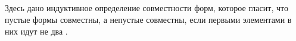 \begin{code}%
\>[0]\<[2]%
\>[2]  \AgdaSymbol{:}  \AgdaSymbol{\{}\AgdaSymbol{\}}         \<%
\\
\>[2]\<[4]%
\>[4] \AgdaSymbol{:} \AgdaInductiveConstructor{[]}  \AgdaInductiveConstructor{[]}\<%
\\
\>[2]\<[4]%
\>[4] \AgdaSymbol{:}  \AgdaSymbol{\{}\AgdaSymbol{\}\{}  \AgdaSymbol{:}  \AgdaSymbol{\}}      \AgdaSymbol{(}  \AgdaSymbol{)}  \AgdaSymbol{(}  \AgdaSymbol{)}\<%
\\
\>[2]\<[4]%
\>[4] \AgdaSymbol{:}  \AgdaSymbol{\{}\AgdaSymbol{\}\{}  \AgdaSymbol{:}  \AgdaSymbol{\}}      \AgdaSymbol{(}  \AgdaSymbol{)}  \AgdaSymbol{(}  \AgdaSymbol{)}\<%
\\
\>[2]\<[4]%
\>[4] \AgdaSymbol{:}  \AgdaSymbol{\{}\AgdaSymbol{\}\{}  \AgdaSymbol{:}  \AgdaSymbol{\}}      \AgdaSymbol{(}  \AgdaSymbol{)}  \AgdaSymbol{(}  \AgdaSymbol{)}\<%
\end{code}

Здесь дано индуктивное определение совместности форм, которое гласит,
что пустые формы совместны, а непустые совместны, если первыми
элементами в них идут не два .

